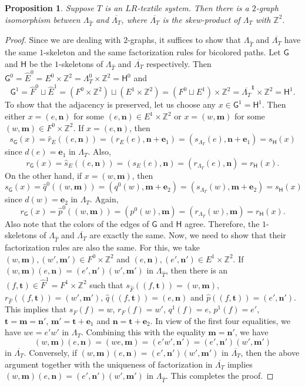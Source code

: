 \documentclass[a4paper,reqno,12pt]{amsart}
\newcommand{\N}{\mathbf{n}}
\newcommand{\M}{\mathbf{m}}
\newcommand{\ea}{\mathbf{e}_1}
\newcommand{\eb}{\mathbf{e}_2}
\newtheorem{prop}[thm]{Proposition}
\theoremstyle{definition}
\theoremstyle{remark}
\begin{document}
\begin{prop}\label{pro covering textile and skew-product graph}
Suppose $T$ is an $LR$-textile system. Then there is a $2$-graph isomorphism between $\Lambda_{\hat{T}}$ and $\overline{\Lambda_T}$, where $\overline{\Lambda_T}$ is the skew-product of $\Lambda_T$ with $\mathbb{Z}^2$. 
\end{prop}
\begin{proof}
Since we are dealing with $2$-graphs, it suffices to show that $\Lambda_{\hat{T}}$ and $\overline{\Lambda_T}$ have the same $1$-skeleton and the same factorization rules for bicolored paths. Let $\mathsf{G}$ and $\mathsf{H}$ be the $1$-skeletons of $\Lambda_{\hat{T}}$ and $\overline{\Lambda_T}$ respectively. Then $\mathsf{G}^0=\hat{E}^0=E^0\times \mathbb{Z}^2=\Lambda_T^0\times \mathbb{Z}^2=\mathsf{H}^0$ and \[\mathsf{G}^1=\hat{F}^0\sqcup \hat{E}^1=(F^0\times \mathbb{Z}^2)\sqcup (E^1\times \mathbb{Z}^2)=(F^0\sqcup E^1)\times \mathbb{Z}^2=\overline{\Lambda_T}^\mathbf{1}\times \mathbb{Z}^2=\mathsf{H}^1.\] To show that the adjacency is preserved, let us choose any $x\in \mathsf{G}^1=\mathsf{H}^1$. Then either $x=(e,\N)$ for some $(e,\N)\in E^1\times \mathbb{Z}^2$ or $x=(w,\M)$ for some $(w,\M)\in F^0\times \mathbb{Z}^2$. If $x=(e,\N)$, then \[s_\mathsf{G}(x)=\hat{r}_E((e,\N))=(r_E(e),\N+\ea)=(s_{\Lambda_T}(e),\N+\ea)=s_\mathsf{H}(x)\] since $d(e)=\ea$ in $\Lambda_T$. Also, \[r_\mathsf{G}(x)=\hat{s}_E((e,\N))=(s_E(e),\N)=(r_{\Lambda_T}(e),\N)=r_\mathsf{H}(x).\] On the other hand, if $x=(w,\M)$, then \[s_\mathsf{G}(x)=\hat{q}^0((w,\M))=(q^0(w),\M+\eb)=(s_{\Lambda_T}(w),\M+\eb)=s_\mathsf{H}(x)\] since $d(w)=\eb$ in $\Lambda_T$. Again, \[r_\mathsf{G}(x)=\hat{p}^0((w,\M))=(p^0(w),\M)=(r_{\Lambda_T}(w),\M)=r_\mathsf{H}(x).\] Also note that the colors of the edges of $\mathsf{G}$ and $\mathsf{H}$ agree. Therefore, the $1$-skeletons of $\Lambda_{\hat{T}}$ and $\overline{\Lambda_T}$ are exactly the same. Now, we need to show that their factorization rules are also the same. For this, we take $(w,\M),(w',\M')\in F^0\times \mathbb{Z}^2$ and $(e,\N),(e',\N')\in E^1\times \mathbb{Z}^2$. If $(w,\M)(e,\N)=(e',\N')(w',\M')$ in $\Lambda_{\hat{T}}$, then there is an $(f,\mathbf{t})\in \hat{F}^1=F^1\times \mathbb{Z}^2$ such that $s_{\hat{F}}((f,\mathbf{t}))=(w,\M)$, $r_{\hat{F}}((f,\mathbf{t}))=(w',\M')$, $\hat{q}((f,\mathbf{t}))=(e,\N)$ and $\hat{p}((f,\mathbf{t}))=(e',\N')$. This implies that $s_F(f)=w$, $r_F(f)=w'$, $q^1(f)=e$, $p^1(f)=e'$, $\mathbf{t}=\M=\N'$, $\M'=\mathbf{t}+\ea$ and $\N=\mathbf{t}+\eb$. In view of the first four equalities, we have $we=e'w'$ in $\Lambda_T$. Combining this with the equality $\M=\N'$, we have \[ (w,\M)(e,\N)=(we,\M)=(e'w',\N')=(e',\N')(w',\M')\] in $\overline{\Lambda_T}$. Conversely, if $(w,\M)(e,\N)=(e',\N')(w',\M')$ in $\overline{\Lambda_T}$, then the above argument together with the uniqueness of factorization in $\overline{\Lambda_T}$ implies $(w,\M)(e,\N)=(e',\N')(w',\M')$ in $\Lambda_{\hat{T}}$. This completes the proof.  
\end{proof}
\end{document}
